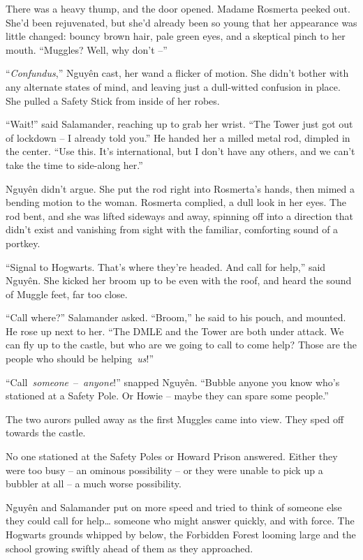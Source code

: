 There was a heavy thump, and the door opened. Madame Rosmerta peeked
out. She'd been rejuvenated, but she'd already been so young that her
appearance was little changed: bouncy brown hair, pale green eyes, and a
skeptical pinch to her mouth. ``Muggles? Well, why don't --''

``\emph{Confundus},'' Nguy\makebox[0pt][l]{\raisebox{0.5ex}{˜}}ên cast,
her wand a flicker of motion. She didn't bother with any alternate
states of mind, and leaving just a dull-witted confusion in place. She
pulled a Safety Stick from inside of her robes.

``Wait!'' said Salamander, reaching up to grab her wrist. ``The Tower
just got out of lockdown -- I already told you.'' He handed her a milled
metal rod, dimpled in the center. ``Use this. It's international, but I
don't have any others, and we can't take the time to side-along her.''

Nguy\makebox[0pt][l]{\raisebox{0.5ex}{˜}}ên didn't argue. She put the
rod right into Rosmerta's hands, then mimed a bending motion to the
woman. Rosmerta complied, a dull look in her eyes. The rod bent, and she
was lifted sideways and away, spinning off into a direction that didn't
exist and vanishing from sight with the familiar, comforting sound of a
portkey.

``Signal to Hogwarts. That's where they're headed. And call for help,''
said Nguy\makebox[0pt][l]{\raisebox{0.5ex}{˜}}ên. She kicked her broom
up to be even with the roof, and heard the sound of Muggle feet, far too
close.

``Call where?'' Salamander asked. ``Broom,'' he said to his pouch, and
mounted. He rose up next to her. ``The DMLE and the Tower are both under
attack. We can fly up to the castle, but who are we going to call to
come help? Those are the people who should be helping~\emph{us}!''

``Call~\emph{someone}~--~\emph{anyone}!'' snapped
Nguy\makebox[0pt][l]{\raisebox{0.5ex}{˜}}ên. ``Bubble anyone you know
who's stationed at a Safety Pole. Or Howie -- maybe they can spare some
people.''

The two aurors pulled away as the first Muggles came into view. They
sped off towards the castle.

No one stationed at the Safety Poles or Howard Prison answered. Either
they were too busy -- an ominous possibility -- or they were unable to
pick up a bubbler at all -- a much worse possibility.

Nguy\makebox[0pt][l]{\raisebox{0.5ex}{˜}}ên and Salamander put on more
speed and tried to think of someone else they could call for
help\ldots{} someone who might answer quickly, and with force. The
Hogwarts grounds whipped by below, the Forbidden Forest looming large
and the school growing swiftly ahead of them as they approached.

